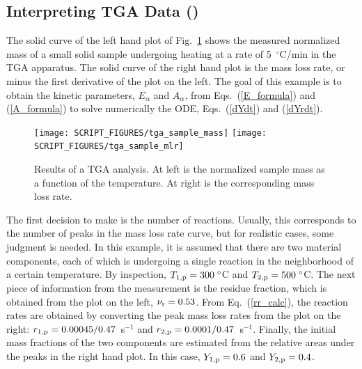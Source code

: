 \documentclass[11pt]{book}
\begin{document}
\subsection{Interpreting TGA Data (\texorpdfstring{}{tga\_sample})}
\label{tga_sample}

The solid curve of the left hand plot of Fig.~\ref{tga_sample_plot} shows the measured normalized mass of a small solid sample undergoing heating at a rate of 5~$^\circ$C/min in the TGA apparatus. The solid curve of the right hand plot is the mass loss rate, or minus the first derivative of the plot on the left. The goal of this example is to obtain the kinetic parameters, $E_\alpha$ and $A_\alpha$, from Eqs.~(\ref{E_formula}) and (\ref{A_formula}) to solve numerically the ODE, Eqs.~(\ref{dYdt}) and (\ref{dYrdt}).
\begin{figure}[!htb]
\texttt{[image: SCRIPT\_FIGURES/tga\_sample\_mass]}
\texttt{[image: SCRIPT\_FIGURES/tga\_sample\_mlr]}
\caption[Results of a TGA analysis]{Results of a TGA analysis. At left is the normalized sample mass as a function of the temperature. At right is the corresponding mass loss rate.}
\label{tga_sample_plot}
\end{figure}
The first decision to make is the number of reactions. Usually, this corresponds to the number of peaks in the mass loss rate curve, but for realistic cases, some judgment is needed. In this example, it is assumed that there are two material components, each of which is undergoing a single reaction in the neighborhood of a certain temperature. By inspection, $T_{1,{\rm p}}=300 \; ^\circ$C and $T_{2,{\rm p}}=500 \; ^\circ$C. The next piece of information from the measurement is the residue fraction, which is obtained from the plot on the left, $\nu_{\rm r}=0.53$. From Eq.~(\ref{rr_calc}), the reaction rates are obtained by converting the peak mass loss rates from the plot on the right: $r_{1,{\rm p}}=0.00045/0.47$~s$^{-1}$ and $r_{2,{\rm p}}=0.0001/0.47$~s$^{-1}$.  Finally, the initial mass fractions of the two components are estimated from the relative areas under the peaks in the right hand plot. In this case, $Y_{1,{\rm p}}=0.6$ and $Y_{2,{\rm p}}=0.4$.
\end{document}
